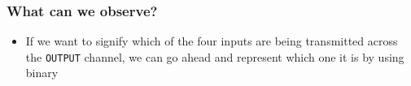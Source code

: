 \documentclass{beamer}
\begin{document}
    	\begin{frame}
    		\frametitle{What can we observe?}
    		\begin{itemize}
    			\item If we want to signify which of the four inputs are being transmitted across the \texttt{OUTPUT} channel, we can go ahead and represent which one it is by using binary
    			
    		\end{itemize}
    		
    		
    		


\begin{tikzpicture}[x=0.75pt,y=0.75pt,yscale=-1,xscale=1]


\end{tikzpicture}
\end{frame}
\end{document}
